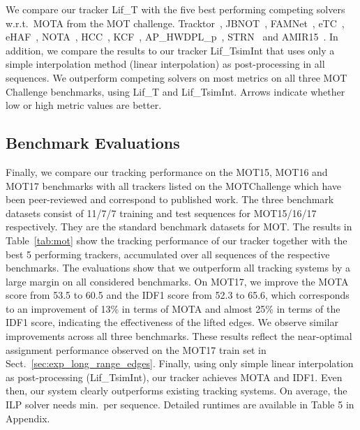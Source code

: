 \documentclass{article}
\begin{document}
\begin{table*}
{\caption{We compare our tracker Lif\_T with the five best performing competing solvers w.r.t.\ MOTA from the MOT challenge. 
Tracktor~\cite{bergmann2019tracking}, 
JBNOT~\cite{henschel2019multiple},
FAMNet~\cite{chu2019famnet},
eTC~\cite{wang2019exploit},
eHAF~\cite{sheng2018heterogeneous},
NOTA~\cite{chen2019aggregate},
HCC~\cite{ma2018customized},
KCF~\cite{chu2019online},
AP\_HWDPL\_p~\cite{chen2017online},
STRN~\cite{xu2019spatial} and
AMIR15~\cite{sadeghian2017tracking}.
In addition, we compare the results to our tracker Lif\_TsimInt that uses only a simple interpolation method (linear interpolation) as post-processing in all sequences.
We outperform competing solvers on most metrics on all three MOT Challenge benchmarks, using Lif\_T and Lif\_TsimInt.  
Arrows indicate whether low or high metric values are better.}
\vspace{-0.2cm}
\label{tab:mot}
}
\end{table*}

\subsection{Benchmark Evaluations}
Finally, we compare our tracking performance on the MOT15, MOT16 and MOT17 benchmarks with all trackers listed on the MOTChallenge which have been peer-reviewed and correspond to published work. 
The three benchmark datasets consist of 11/7/7 training and test sequences for MOT15/16/17 respectively.
They are the standard benchmark datasets for MOT.
The results in Table~\ref{tab:mot} show the tracking performance of our tracker together with the best 5 performing trackers, accumulated over all sequences of the respective benchmarks. 
The evaluations show that we outperform all tracking systems by a large margin on all considered benchmarks. On MOT17, we improve the MOTA score from 53.5 to 60.5 and the IDF1 score from  52.3 to 65.6, which corresponds to an improvement of 13\% in terms of MOTA and almost 25\% in terms of the IDF1 score, indicating the effectiveness of the lifted edges. We observe similar improvements across all three benchmarks. These results reflect the near-optimal assignment performance observed on the MOT17 train set in Sect.~\ref{sec:exp_long_range_edges}. 
Finally, using only simple linear interpolation as post-processing (Lif\_TsimInt), our tracker achieves   MOTA and  IDF1. Even then, our system clearly outperforms existing tracking systems. On average, the ILP solver needs  min.\ per sequence. Detailed runtimes are available in Table 5 in Appendix. 
\end{document}
